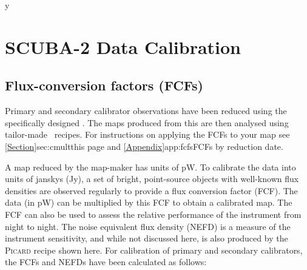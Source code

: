 y\chapter{SCUBA-2 Data Calibration}
\label{app:cal}

\section{Flux-conversion factors (FCFs)}
\label{app:fcf}

Primary and secondary calibrator observations have been reduced using
the specifically designed .  The
maps produced from this are then analysed using tailor-made \picard\
recipes. For instructions on applying the FCFs to your map see
\cref{Section}{sec:cmult}{this page} and
\cref{Appendix}{app:fcfs}{FCFs by reduction date}.

A map reduced by the map-maker has units of pW. To calibrate the data
into units of janskys (Jy), a set of bright, point-source objects with
well-known flux densities are observed regularly to provide a flux
conversion factor (FCF). The data (in pW) can be multiplied by this
FCF to obtain a calibrated map. The FCF can also be used to assess the
relative performance of the instrument from night to night. The noise
equivalent flux density (NEFD) is a measure of the instrument
sensitivity, and while not discussed here, is also produced by the
\textsc{Picard} recipe shown here. For calibration of primary and
secondary calibrators, the FCFs and NEFDs have been calculated as
follows:

